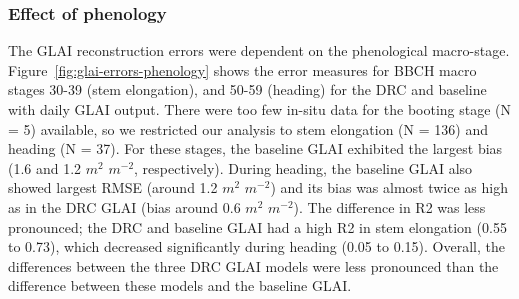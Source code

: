 
\subsubsection{Effect of phenology}
The \gls{GLAI} reconstruction errors were dependent on the phenological macro-stage. Figure~\ref{fig:glai-errors-phenology} shows the error measures for \gls{BBCH} macro stages 30-39 (stem elongation), and 50-59 (heading) for the \gls{DRC} and baseline with daily \gls{GLAI} output. There were too few in-situ data for the booting stage (N = 5) available, so we restricted our analysis to stem elongation (N = 136) and heading (N = 37). For these stages, the baseline \gls{GLAI} exhibited the largest bias (1.6 and 1.2 $m^2$ $m^{-2}$, respectively). During heading, the baseline \gls{GLAI} also showed largest \gls{RMSE} (around 1.2 $m^2$ $m^{-2}$) and its bias was almost twice as high as in the \gls{DRC} \gls{GLAI} (bias around 0.6 $m^2$ $m^{-2}$). The difference in \gls{R2} was less pronounced; the \gls{DRC} and baseline \gls{GLAI} had a high \gls{R2} in stem elongation (0.55 to 0.73), which decreased significantly during heading (0.05 to 0.15). Overall, the differences between the three \gls{DRC} \gls{GLAI} models were less pronounced than the difference between these models and the baseline \gls{GLAI}.

